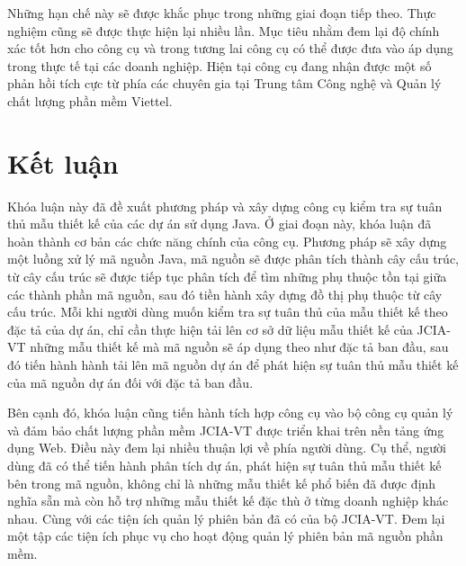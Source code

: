 \documentclass[12pt]{report}
\begin{document}
\noindent Những hạn chế này sẽ được khắc phục trong những giai đoạn tiếp theo. Thực nghiệm cũng sẽ được thực hiện lại nhiều lần. Mục tiêu nhằm đem lại độ chính xác tốt hơn cho công cụ và trong tương lai công cụ có thể được đưa vào áp dụng trong thực tế tại các doanh nghiệp. Hiện tại công cụ đang nhận được một số phản hồi tích cực từ phía các chuyên gia tại Trung tâm Công nghệ và Quản lý chất lượng phần mềm Viettel.

\chapter{Kết luận}
Khóa luận này đã đề xuất phương pháp và xây dựng công cụ kiểm tra sự tuân thủ mẫu thiết kế của các dự án sử dụng Java. Ở giai đoạn này, khóa luận đã hoàn thành cơ bản các chức năng chính của công cụ. Phương pháp sẽ xây dựng một luồng xử lý mã nguồn Java, mã nguồn sẽ được phân tích thành cây cấu trúc, từ cây cấu trúc sẽ được tiếp tục phân tích để tìm những phụ thuộc tồn tại giữa các thành phần mã nguồn, sau đó tiền hành xây dựng đồ thị phụ thuộc từ cây cấu trúc. Mỗi khi người dùng muốn kiểm tra sự tuân thủ của mẫu thiết kế theo đặc tả của dự án, chỉ cần thực hiện tải lên cơ sở dữ liệu mẫu thiết kế của JCIA-VT những mẫu thiết kế mà mã nguồn sẽ áp dụng theo như đặc tả ban đầu, sau đó tiến hành hành tải lên mã nguồn dự án để phát hiện sự tuân thủ mẫu thiết kế của mã nguồn dự án đối với đặc tả ban đầu.

\noindent Bên cạnh đó, khóa luận cũng tiến hành tích hợp công cụ vào bộ công cụ quản lý và đảm bảo chất lượng phần mềm JCIA-VT được triển khai trên nền tảng ứng dụng Web. Điều này đem lại nhiều thuận lợi về phía người dùng. Cụ thể, người dùng đã có thể tiến hành phân tích dự án, phát hiện sự tuân thủ mẫu thiết kế bên trong mã nguồn, không chỉ là những mẫu thiết kế phổ biến đã được định nghĩa sẵn mà còn hỗ trợ những mẫu thiết kế đặc thù ở từng doanh nghiệp khác nhau. Cùng với các tiện ích quản lý phiên bản đã có của bộ JCIA-VT. Đem lại một tập các tiện ích phục vụ cho hoạt động quản lý phiên bản mã nguồn phần mềm.
\end{document}
